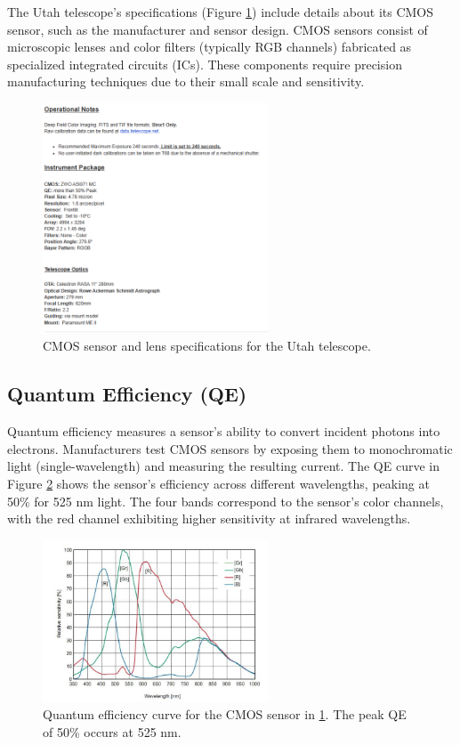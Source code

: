 \documentclass[12pt,oneside,a4paper,english]{article}
\begin{document}
The Utah telescope's specifications (Figure \ref{utah3}) include details about its CMOS sensor, such as the manufacturer and sensor design. CMOS sensors consist of microscopic lenses and color filters (typically RGB channels) fabricated as specialized integrated circuits (ICs). These components require precision manufacturing techniques due to their small scale and sensitivity.

\begin{figure}[H]
    \centering
    \includegraphics[width=0.6\textwidth]{Utah2.png}
    \caption{CMOS sensor and lens specifications for the Utah telescope.\cite{utahscope}}
    \label{utah3}
\end{figure}

\subsection{Quantum Efficiency (QE)}
Quantum efficiency measures a sensor's ability to convert incident photons into electrons. Manufacturers test CMOS sensors by exposing them to monochromatic light (single-wavelength) and measuring the resulting current. The QE curve in Figure \ref{qe1} shows the sensor's efficiency across different wavelengths, peaking at 50\% for 525 nm light. The four bands correspond to the sensor's color channels, with the red channel exhibiting higher sensitivity at infrared wavelengths.

\begin{figure}[H]
    \centering
    \includegraphics[width=0.6\textwidth]{QECurve.png}
    \caption{Quantum efficiency curve for the CMOS sensor in \ref{utah3}. The peak QE of 50\% occurs at 525 nm.\cite{cam1}}
    \label{qe1}
\end{figure}
\end{document}
